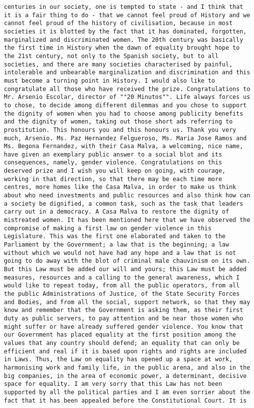 \documentclass[
]{article}
\begin{document}
\begin{verbatim}
centuries in our society, one is tempted to state - and I think that it is a fair thing to do - that we cannot feel proud of History and we cannot feel proud of the history of civilisation, because in most societies it is blotted by the fact that it has dominated, forgotten, marginalized and discriminated women. The 20th century was basically the first time in History when the dawn of equality brought hope to the 21st century, not only to the Spanish society, but to all societies, and there are many societies characterised by painful, intolerable and unbearable marginalization and discrimination and this must become a turning point in History. I would also like to congratulate all those who have received the prize. Congratulations to Mr. Arsenio Escolar, director of ""20 Minutos"". Life always forces us to chose, to decide among different dilemmas and you chose to support the dignity of women when you had to choose among publicity benefits and the dignity of women, taking out those short ads referring to prostitution. This honours you and this honours us. Thank you very much, Arsenio. Ms. Paz Hernandez Felgueroso, Ms. Maria Jose Ramos and Ms. Begona Fernandez, with their Casa Malva, a welcoming, nice name, have given an exemplary public answer to a social blot and its consequences, namely, gender violence. Congratulations on this deserved prize and I wish you will keep on going, with courage, working in that direction, so that there may be each time more centres, more homes like the Casa Malva, in order to make us think about who need investments and public resources and also think how can a society be dignified, a common task, such as the task that leaders carry out in a democracy. A Casa Malva to restore the dignity of mistreated women. It has been mentioned here that we have observed the compromise of making a first law on gender violence in this Legislature. This was the first one elaborated and taken to the Parliament by the Government; a law that is the beginning; a law without which we would not have had any hope and a law that is not going to do away with the blot of criminal male chauvinism on its own. But this Law must be added our will and yours; this Law must be added measures, resources and a calling to the general awareness, which I would like to repeat today, from all the public operators, from all the public Administrations of Justice, of the State Security Forces and Bodies, and from all the social, support network, so that they may know and remember that the Government is asking them, as their first duty as public servers, to pay attention and be near those women who might suffer or have already suffered gender violence. You know that our Government has placed equality at the first position among the values that any country should defend; an equality that can only be efficient and real if it is based upon rights and rights are included in Laws. Thus, the Law on equality has opened up a space at work, harmonising work and family life, in the public arena, and also in the big companies, in the area of economic power, a determinant, decisive space for equality. I am very sorry that this Law has not been supported by all the political parties and I am even sorrier about the fact that it has been appealed before the Constitutional Court. It is 
\end{verbatim}
\end{document}
